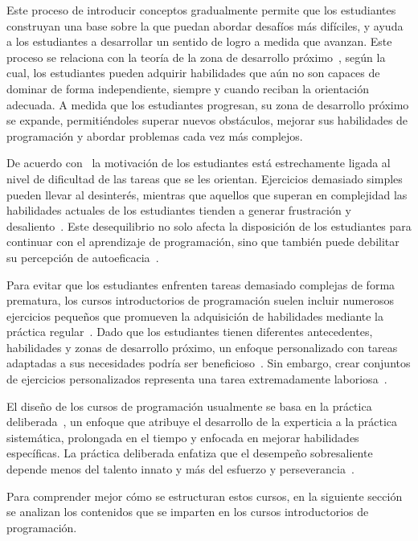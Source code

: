 \documentclass{article}
\begin{document}
Este proceso de introducir conceptos gradualmente permite que los estudiantes construyan una base sobre la que puedan abordar desafíos más difíciles, y ayuda a los estudiantes a desarrollar un sentido de logro a medida que avanzan. Este proceso se relaciona con la teoría de la zona de desarrollo próximo~\cite{vygotsky1978mind}, según la cual, los estudiantes pueden adquirir habilidades que aún no son capaces de dominar de forma independiente, siempre y cuando reciban la orientación adecuada. A medida que los estudiantes progresan, su zona de desarrollo próximo se expande, permitiéndoles superar nuevos obstáculos, mejorar sus habilidades de programación y abordar problemas cada vez más complejos.

De acuerdo con~\cite{rosenzweig2019expectancy} la motivación de los estudiantes está estrechamente ligada al nivel de dificultad de las tareas que se les orientan. Ejercicios demasiado simples pueden llevar al desinterés, mientras que aquellos que superan en complejidad las habilidades actuales de los estudiantes tienden a generar frustración y desaliento~\cite{rosenzweig2019expectancy}. Este desequilibrio no solo afecta la disposición de los estudiantes para continuar con el aprendizaje de programación, sino que también puede debilitar su percepción de autoeficacia~\cite{bandura1977self}.

Para evitar que los estudiantes enfrenten tareas demasiado complejas de forma prematura, los cursos introductorios de programación suelen incluir numerosos ejercicios pequeños que promueven la adquisición de habilidades mediante la práctica regular~\cite{allen2018msp, vihavainen2011extreme}. Dado que los estudiantes tienen diferentes antecedentes, habilidades y zonas de desarrollo próximo, un enfoque personalizado con tareas adaptadas a sus necesidades podría ser beneficioso~\cite{leinonen2021exploring}. Sin embargo, crear conjuntos de ejercicios personalizados representa una tarea extremadamente laboriosa~\cite{lobb2016coderunner, wrenn2018whotests}.

El diseño de los cursos de programación usualmente se basa en la práctica deliberada~\cite{ericsson1993deliberate}, un enfoque que atribuye el desarrollo de la experticia a la práctica sistemática, prolongada en el tiempo y enfocada en mejorar habilidades específicas. La práctica deliberada enfatiza que el desempeño sobresaliente depende menos del talento innato y más del esfuerzo y perseverancia~\cite{duckworth2013true}.

Para comprender mejor cómo se estructuran estos cursos, en la siguiente sección se analizan los contenidos que se imparten en los cursos introductorios de programación.
\end{document}
